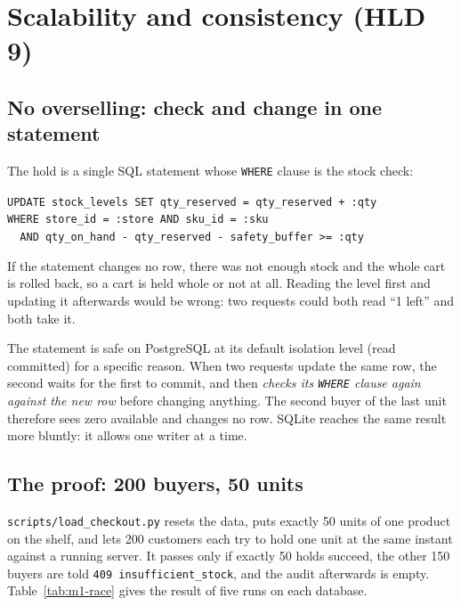 \section{Scalability and consistency (HLD 9)}
\label{sec:m1-consistency}

\subsection{No overselling: check and change in one statement}

The hold is a single SQL statement whose \texttt{WHERE} clause is the stock check:
\begin{center}\small
  \verb|UPDATE stock_levels SET qty_reserved = qty_reserved + :qty|\\
  \verb|WHERE store_id = :store AND sku_id = :sku|\\
  \verb|  AND qty_on_hand - qty_reserved - safety_buffer >= :qty|
\end{center}
If the statement changes no row, there was not enough stock and the whole cart is rolled back, so a cart is held
whole or not at all. Reading the level first and updating it afterwards would be wrong: two requests could both read
``1 left'' and both take it.

The statement is safe on PostgreSQL at its default isolation level (read committed) for a specific reason. When two
requests update the same row, the second waits for the first to commit, and then \emph{checks its \texttt{WHERE}
clause again against the new row} before changing anything. The second buyer of the last unit therefore sees zero
available and changes no row. SQLite reaches the same result more bluntly: it allows one writer at a time.

\subsection{The proof: 200 buyers, 50 units}

\texttt{scripts/load\_checkout.py} resets the data, puts exactly 50 units of one product on the shelf, and lets 200
customers each try to hold one unit at the same instant against a running server. It passes only if exactly 50 holds
succeed, the other 150 buyers are told \texttt{409 insufficient\_stock}, and the audit afterwards is empty.
Table~\ref{tab:m1-race} gives the result of five runs on each database.

